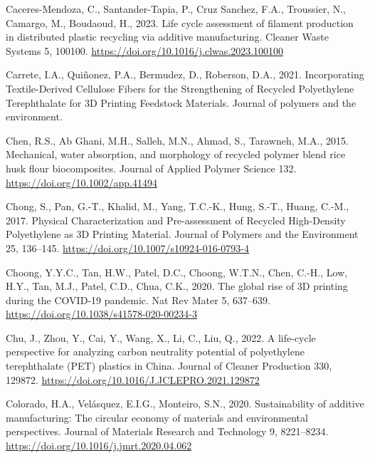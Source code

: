 \documentclass[
  12pt,
  number,
  review]{elsarticle}
\newlength{\cslhangindent}
\newlength{\cslentryspacingunit} %
\newenvironment{CSLReferences}[2] %
 {%
  \setlength{\parindent}{0pt}
  \ifodd #1
  \let\oldpar\par
  \def\par{\hangindent=\cslhangindent\oldpar}
  \fi
  \setlength{\parskip}{#2\cslentryspacingunit}
 }%
 {}
\begin{document}
\begin{CSLReferences}{1}{0}
\leavevmode{}%
Caceres-Mendoza, C., Santander-Tapia, P., Cruz Sanchez, F.A., Troussier,
N., Camargo, M., Boudaoud, H., 2023. Life cycle assessment of filament
production in distributed plastic recycling via additive manufacturing.
Cleaner Waste Systems 5, 100100.
\url{https://doi.org/10.1016/j.clwas.2023.100100}

\leavevmode{}%
Carrete, I.A., Quiñonez, P.A., Bermudez, D., Roberson, D.A., 2021.
Incorporating {Textile-Derived Cellulose Fibers} for the {Strengthening}
of {Recycled Polyethylene Terephthalate} for {3D Printing Feedstock
Materials}. Journal of polymers and the environment.

\leavevmode{}%
Chen, R.S., Ab Ghani, M.H., Salleh, M.N., Ahmad, S., Tarawneh, M.A.,
2015. Mechanical, water absorption, and morphology of recycled polymer
blend rice husk flour biocomposites. Journal of Applied Polymer Science
132. \url{https://doi.org/10.1002/app.41494}

\leavevmode{}%
Chong, S., Pan, G.-T., Khalid, M., Yang, T.C.-K., Hung, S.-T., Huang,
C.-M., 2017. Physical {Characterization} and {Pre-assessment} of
{Recycled High-Density Polyethylene} as {3D Printing Material}. Journal
of Polymers and the Environment 25, 136--145.
\url{https://doi.org/10.1007/s10924-016-0793-4}

\leavevmode{}%
Choong, Y.Y.C., Tan, H.W., Patel, D.C., Choong, W.T.N., Chen, C.-H.,
Low, H.Y., Tan, M.J., Patel, C.D., Chua, C.K., 2020. The global rise of
3D printing during the {COVID}-19 pandemic. Nat Rev Mater 5, 637--639.
\url{https://doi.org/10.1038/s41578-020-00234-3}

\leavevmode{}%
Chu, J., Zhou, Y., Cai, Y., Wang, X., Li, C., Liu, Q., 2022. A
life-cycle perspective for analyzing carbon neutrality potential of
polyethylene terephthalate ({PET}) plastics in {China}. Journal of
Cleaner Production 330, 129872.
\url{https://doi.org/10.1016/J.JCLEPRO.2021.129872}

\leavevmode{}%
Colorado, H.A., Velásquez, E.I.G., Monteiro, S.N., 2020. Sustainability
of additive manufacturing: The circular economy of materials and
environmental perspectives. Journal of Materials Research and Technology
9, 8221--8234. \url{https://doi.org/10.1016/j.jmrt.2020.04.062}


\end{CSLReferences}
\end{document}
